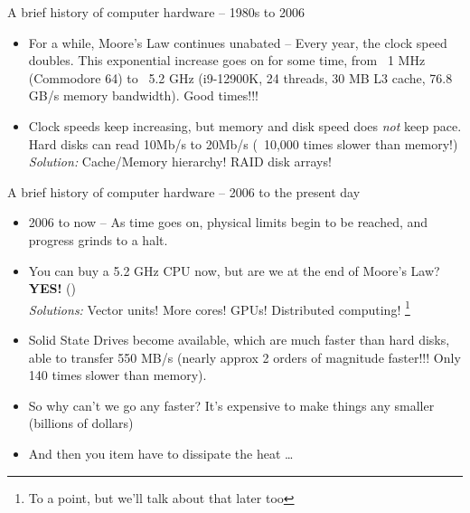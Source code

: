 \documentclass{beamer}
\begin{document}
\begin{frame}{A brief history of computer hardware -- 1980s to 2006}
	\begin{itemize}
\item For a while, Moore's Law continues unabated --
Every year, the clock speed doubles.
 This exponential increase goes on for some time, from ~1 MHz (Commodore 64) to
 ~5.2 GHz (i9-12900K, 24 threads, 30 MB L3 cache, 76.8 GB/s memory bandwidth). Good times!!!

\item	Clock speeds keep increasing, but memory and disk speed does \emph{not} keep pace.
Hard disks can read 10Mb/s to 20Mb/s (~10,000 times slower than memory!) \\
	\emph{Solution:} Cache/Memory hierarchy! RAID disk arrays!
	\end{itemize}
\end{frame}

\begin{frame}{A brief history of computer hardware -- 2006 to the present day}
	\begin{itemize}
		\item	2006 to now -- As time goes on, physical limits begin to be reached, and progress grinds to a halt.
		\item You can buy a 5.2 GHz CPU now, but are we at the end of Moore's Law? \textbf{YES!} (\cite{SophieWilson})\\
			\emph{Solutions:} Vector units! More cores! GPUs! Distributed computing! \footnote{To a point, but we'll talk about that later too}
		\item Solid State Drives become available, which are much faster than hard disks,
			able to transfer 550 MB/s (nearly approx 2 orders of magnitude faster!!! Only 140 times slower than memory). %
		\item So why can't we go any faster? It's expensive to make things any smaller (billions of dollars)
		\item And then you item have to dissipate the heat \ldots
	\end{itemize}
	
\end{frame}
\end{document}
